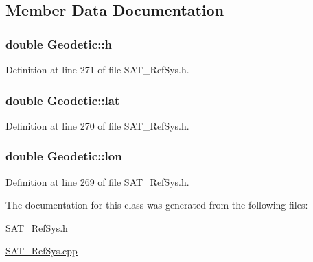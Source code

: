 \subsection{Member Data Documentation}
\hypertarget{classGeodetic_a7e0792c8e2f5fa75821a5b0ad94d5242}{
\subsubsection[{h}]{\setlength{\rightskip}{0pt plus 5cm}double Geodetic\-::h}}\label{classGeodetic_a7e0792c8e2f5fa75821a5b0ad94d5242}


Definition at line 271 of file S\-A\-T\-\_\-\-Ref\-Sys.\-h.

\hypertarget{classGeodetic_a7e1fb26747be20d8c48009c8d5caa272}{
\subsubsection[{lat}]{\setlength{\rightskip}{0pt plus 5cm}double Geodetic\-::lat}}\label{classGeodetic_a7e1fb26747be20d8c48009c8d5caa272}


Definition at line 270 of file S\-A\-T\-\_\-\-Ref\-Sys.\-h.

\hypertarget{classGeodetic_a59a979c3f60a77eb5f2ac80f374f7d23}{
\subsubsection[{lon}]{\setlength{\rightskip}{0pt plus 5cm}double Geodetic\-::lon}}\label{classGeodetic_a59a979c3f60a77eb5f2ac80f374f7d23}


Definition at line 269 of file S\-A\-T\-\_\-\-Ref\-Sys.\-h.



The documentation for this class was generated from the following files\-:\begin{DoxyCompactItemize}
\item 
\hyperlink{SAT__RefSys_8h}{S\-A\-T\-\_\-\-Ref\-Sys.\-h}\item 
\hyperlink{SAT__RefSys_8cpp}{S\-A\-T\-\_\-\-Ref\-Sys.\-cpp}\end{DoxyCompactItemize}
